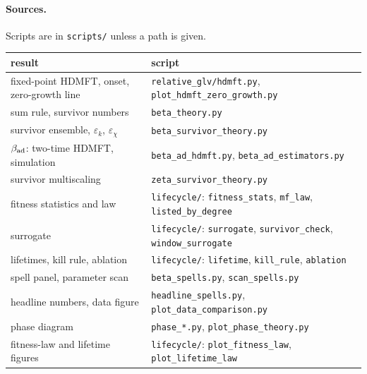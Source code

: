 \documentclass[11pt]{article}
\newcommand{\bad}{\beta_{\rm ad}}
\begin{document}
\paragraph{Sources.}  Scripts are in \texttt{scripts/} unless a path is given.
\begin{center}\small
\begin{tabular}{p{}p{}}
\toprule
result & script\\
\midrule
fixed-point HDMFT, onset, zero-growth line & \texttt{relative\_glv/hdmft.py}, \texttt{plot\_hdmft\_zero\_growth.py}\\
sum rule, survivor numbers & \texttt{beta\_theory.py}\\
survivor ensemble, $\varepsilon_k$, $\varepsilon_\chi$ & \texttt{beta\_survivor\_theory.py}\\
$\bad$: two-time HDMFT, simulation & \texttt{beta\_ad\_hdmft.py}, \texttt{beta\_ad\_estimators.py}\\
survivor multiscaling & \texttt{zeta\_survivor\_theory.py}\\
fitness statistics and law & \texttt{lifecycle/}: \texttt{fitness\_stats}, \texttt{mf\_law}, \texttt{listed\_by\_degree}\\
surrogate & \texttt{lifecycle/}: \texttt{surrogate}, \texttt{survivor\_check}, \texttt{window\_surrogate}\\
lifetimes, kill rule, ablation & \texttt{lifecycle/}: \texttt{lifetime}, \texttt{kill\_rule}, \texttt{ablation}\\
spell panel, parameter scan & \texttt{beta\_spells.py}, \texttt{scan\_spells.py}\\
headline numbers, data figure & \texttt{headline\_spells.py}, \texttt{plot\_data\_comparison.py}\\
phase diagram & \texttt{phase\_*.py}, \texttt{plot\_phase\_theory.py}\\
fitness-law and lifetime figures & \texttt{lifecycle/}: \texttt{plot\_fitness\_law}, \texttt{plot\_lifetime\_law}\\
\bottomrule
\end{tabular}
\end{center}

\printbibliography[heading=bibintoc]
\end{document}
